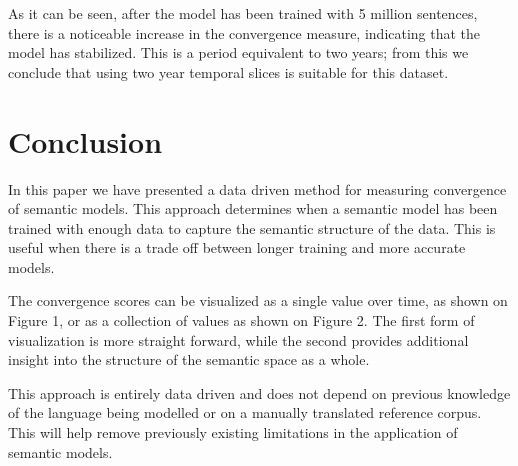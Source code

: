 \documentclass{article} %
\begin{document}
As it can be seen, after the model has been trained with 5 million sentences, there is a noticeable increase in the convergence measure, indicating that the model has stabilized. This is a period equivalent to two years; from this we conclude that using two year temporal slices is suitable for this dataset.

\section{Conclusion}
\label{sec:conclusion}
In this paper we have presented a data driven method for measuring convergence of semantic models. This approach determines when a semantic model has been trained with enough data to capture the semantic structure of the data. This is useful when there is a trade off between longer training and more accurate models.

The convergence scores can be visualized as a single value over time, as shown on Figure 1, or as a collection of values as shown on Figure 2. The first form of visualization is more straight forward, while the second provides additional insight into the structure of the semantic space as a whole.

This approach is entirely data driven and does not depend on previous knowledge of the language being modelled or on a manually translated reference corpus. This will help remove previously existing limitations in the application of semantic models.



\end{document}

